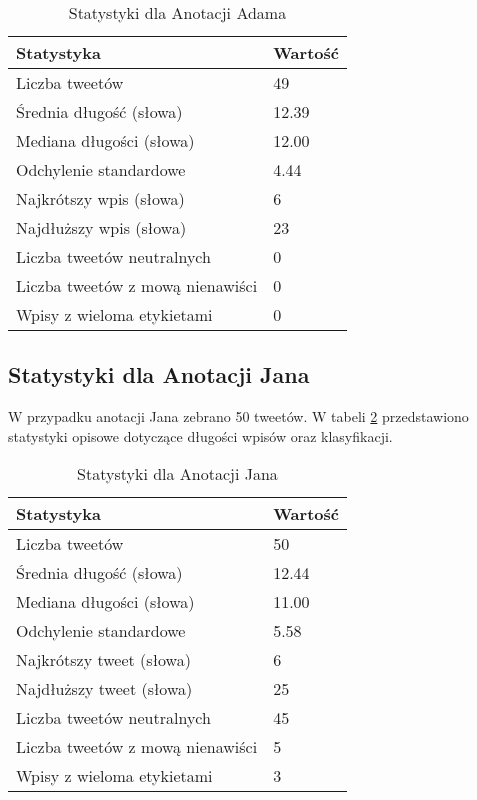 \documentclass[12pt]{article}
\begin{document}
\begin{table}[h]
    \centering
    \caption{Statystyki dla Anotacji Adama}
    \label{tab:adam_stats}
    \begin{tabular}{|l|l|}
        \hline
        Statystyka & Wartość \\ \hline
        Liczba tweetów & 49 \\ \hline
        Średnia długość (słowa) & 12.39 \\ \hline
        Mediana długości (słowa) & 12.00 \\ \hline
        Odchylenie standardowe & 4.44 \\ \hline
        Najkrótszy wpis (słowa) & 6 \\ \hline
        Najdłuższy wpis (słowa) & 23 \\ \hline
        Liczba tweetów neutralnych & 0 \\ \hline
        Liczba tweetów z mową nienawiści & 0 \\ \hline
        Wpisy z wieloma etykietami & 0 \\ \hline
    \end{tabular}
\end{table}

\subsection{Statystyki dla Anotacji Jana}
W przypadku anotacji Jana zebrano 50 tweetów. W tabeli \ref{tab:jan_stats} przedstawiono statystyki opisowe dotyczące długości wpisów oraz klasyfikacji.

\begin{table}[h]
    \centering
    \caption{Statystyki dla Anotacji Jana}
    \label{tab:jan_stats}
    \begin{tabular}{|l|l|}
        \hline
        Statystyka & Wartość \\ \hline
        Liczba tweetów & 50 \\ \hline
        Średnia długość (słowa) & 12.44 \\ \hline
        Mediana długości (słowa) & 11.00 \\ \hline
        Odchylenie standardowe & 5.58 \\ \hline
        Najkrótszy tweet (słowa) & 6 \\ \hline
        Najdłuższy tweet (słowa) & 25 \\ \hline
        Liczba tweetów neutralnych & 45 \\ \hline
        Liczba tweetów z mową nienawiści & 5 \\ \hline
        Wpisy z wieloma etykietami & 3 \\ \hline
    \end{tabular}
\end{table}
\end{document}
